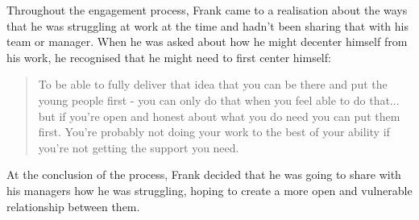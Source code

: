 Throughout the engagement process, Frank came to a realisation about the ways that he was struggling at work at the time and hadn't been sharing that with his team or manager. When he was asked about how he might decenter himself from his work, he recognised that he might need to first center himself:
\begin{quote}
To be able to fully deliver that idea that you can be there and put the young people first - you can only do that when you feel able to do that... but if you're open and honest about what you do need you can put them first. You're probably not doing your work to the best of your ability if you're not getting the support you need.
\end{quote}
At the conclusion of the process, Frank decided that he was going to share with his managers how he was struggling, hoping to create a more open and vulnerable relationship between them. 

